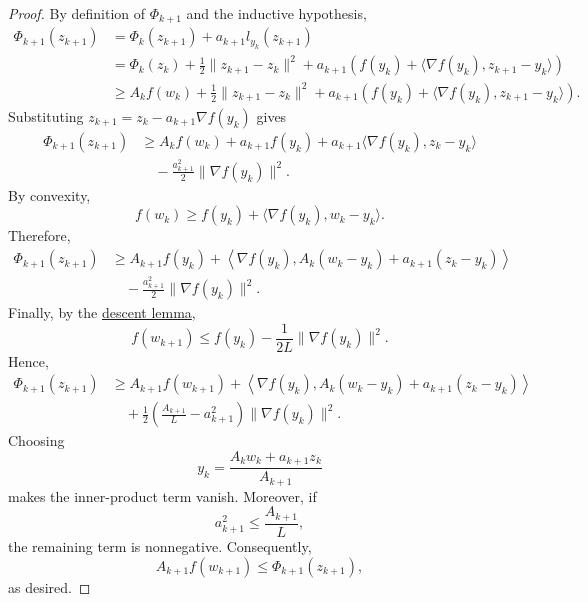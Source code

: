 	\begin{proof}
		By definition of $\Phi_{k+1}$ and the inductive hypothesis,
		\begin{align}
			\Phi_{k+1}(z_{k+1})
			&= \Phi_k(z_{k+1}) + a_{k+1}l_{y_k}(z_{k+1}) \\
			&= \Phi_k(z_k) + \frac{1}{2}\|z_{k+1}-z_k\|^2
				+ a_{k+1}\left(
					f(y_k) + \langle \nabla f(y_k),z_{k+1}-y_k\rangle
				\right) \\
			&\geq A_k f(w_k) + \frac{1}{2}\|z_{k+1}-z_k\|^2
				+ a_{k+1}\left(
					f(y_k) + \langle \nabla f(y_k),z_{k+1}-y_k\rangle
				\right).
		\end{align}
		Substituting $z_{k+1}=z_k-a_{k+1}\nabla f(y_k)$ gives
		\begin{align}
			\Phi_{k+1}(z_{k+1})
			&\geq A_k f(w_k) + a_{k+1}f(y_k)
				+ a_{k+1}\langle \nabla f(y_k),z_k-y_k\rangle \\
			&\quad - \frac{a_{k+1}^2}{2}\|\nabla f(y_k)\|^2.
		\end{align}
		By convexity,
		\begin{equation}
			f(w_k) \geq f(y_k)
				+ \langle \nabla f(y_k),w_k-y_k\rangle.
		\end{equation}
		Therefore,
		\begin{align}
			\Phi_{k+1}(z_{k+1})
			&\geq A_{k+1}f(y_k)
				+ \left\langle \nabla f(y_k),
					A_k(w_k-y_k)+a_{k+1}(z_k-y_k)
				\right\rangle \\
			&\quad - \frac{a_{k+1}^2}{2}\|\nabla f(y_k)\|^2.
		\end{align}
		Finally, by the \hyperref[thm:descent-lemma]{descent lemma},
		\begin{equation}
			f(w_{k+1})
			\leq f(y_k)-\frac{1}{2L}\|\nabla f(y_k)\|^2.
		\end{equation}
		Hence,
		\begin{align}
			\Phi_{k+1}(z_{k+1})
			&\geq A_{k+1}f(w_{k+1})
				+ \left\langle \nabla f(y_k),
					A_k(w_k-y_k)+a_{k+1}(z_k-y_k)
				\right\rangle \\
			&\quad + \frac{1}{2}
				\left(\frac{A_{k+1}}{L}-a_{k+1}^2\right)
				\|\nabla f(y_k)\|^2.
		\end{align}
		Choosing
		\begin{equation}
			y_k=\frac{A_kw_k+a_{k+1}z_k}{A_{k+1}}
		\end{equation}
		makes the inner-product term vanish. Moreover, if
		\begin{equation}
			a_{k+1}^2\leq\frac{A_{k+1}}{L},
		\end{equation}
		the remaining term is nonnegative. Consequently,
		\begin{equation}
			A_{k+1}f(w_{k+1})
			\leq\Phi_{k+1}(z_{k+1}),
		\end{equation}
		as desired.
	\end{proof}


